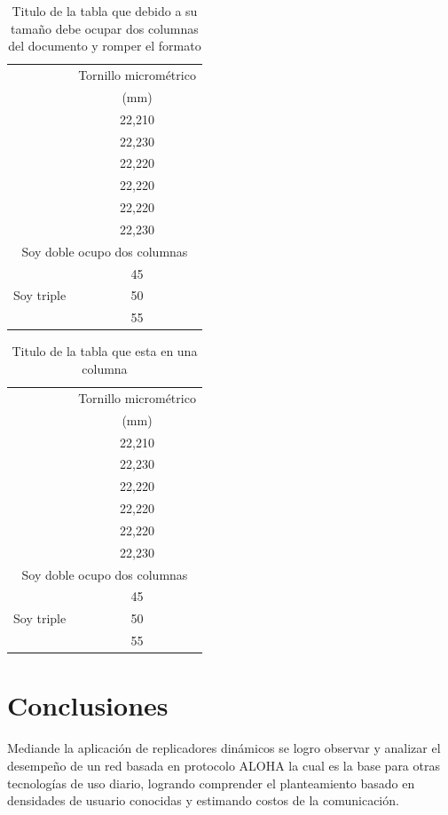 \documentclass[journal]{IEEEtran}
\begin{document}
\begin{table}
\centering
\caption{Titulo de la tabla que debido a su tamaño debe ocupar dos columnas del documento y romper el formato}
\begin{tabular}{c c}
\hline
\hline
&Tornillo micrométrico\\
&(mm)\\
\hline
&22,210\\
&22,230\\
&22,220\\
&22,220\\
&22,220 \\
&22,230 \\    
\multicolumn{2}{c}{Soy doble ocupo dos columnas}\\
\multirow{3}{*}{Soy triple} & 45\\
& 50\\
& 55\\
\hline
\hline
\end{tabular}
\end{table}

\begin{table}
\centering
\caption{Titulo de la tabla que esta en una columna}
\begin{tabular}{c c}
\hline
\hline
&Tornillo micrométrico\\
&(mm)\\
\hline
&22,210\\
&22,230\\
&22,220\\
&22,220\\
&22,220 \\
&22,230 \\    
\multicolumn{2}{c}{Soy doble ocupo dos columnas}\\
\multirow{3}{*}{Soy triple} & 45\\
& 50\\
& 55\\
\hline
\hline
\end{tabular}
\end{table}



\section{Conclusiones}

Mediande la aplicación de replicadores dinámicos se logro observar y analizar el desempeño de un red basada en protocolo ALOHA la cual es la base para otras tecnologías de uso diario, logrando comprender el planteamiento basado en densidades de usuario conocidas y estimando costos de la comunicación.\\
\end{document}
